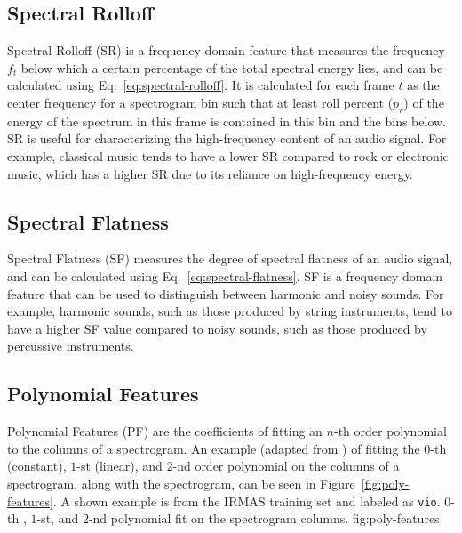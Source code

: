 \subsection{Spectral Rolloff}
\label{sec:spectral-rolloff}
Spectral Rolloff (SR) is a frequency domain feature that measures the frequency $f_t$ below which a certain percentage of the total spectral energy lies, and can be calculated using Eq.~\ref{eq:spectral-rolloff}. It is calculated for each frame $t$ as the center frequency for a spectrogram bin such that at least roll percent ($p_r$) of the energy of the spectrum in this frame is contained in this bin and the bins below. 
\SRequation
SR is useful for characterizing the high-frequency content of an audio signal. For example, classical music tends to have a lower SR compared to rock or electronic music, which has a higher SR due to its reliance on high-frequency energy.

\subsection{Spectral Flatness}
\label{sec:spectral-flatness}
Spectral Flatness (SF) measures the degree of spectral flatness of an audio signal, and can be calculated using Eq.~\ref{eq:spectral-flatness}.
\SFequation
SF is a frequency domain feature that can be used to distinguish between harmonic and noisy sounds. For example, harmonic sounds, such as those produced by string instruments, tend to have a higher SF value compared to noisy sounds, such as those produced by percussive instruments.

\subsection{Polynomial Features}
\label{sec:poly-features}
Polynomial Features (PF) are the coefficients of fitting an $n$-th order polynomial to the columns of a spectrogram. An example (adapted from \cite{mcfee2015librosa}) of fitting the $0$-th (constant), $1$-st (linear), and $2$-nd order polynomial on the columns of a spectrogram, along with the spectrogram, can be seen in Figure~\ref{fig:poly-features}. A shown example is from the IRMAS training set and labeled as \texttt{vio}.
	        {$0$-th , $1$-st, and $2$-nd polynomial fit on the spectrogram columns.}
                {fig:poly-features}

